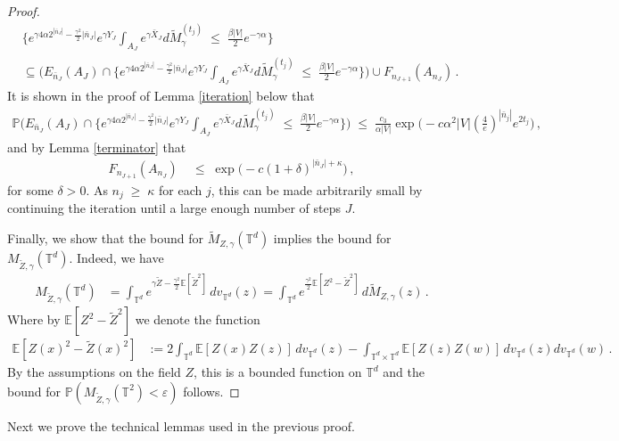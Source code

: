 \documentclass[11pt]{article}
\numberwithin{equation}{section}
\theoremstyle{definition}
\renewcommand{\tilde}{\widetilde}          %
\renewcommand{\leq}{\;\leqslant\;}                   %
\renewcommand{\geq}{\;\geqslant\;}                   %
\newcommand{\E}{\mathbb{E}}
\renewcommand{\P}{\mathbb{P}}
\def\eps{\varepsilon}
\def\T{\mathbb{T}}
\newcommand{\ab}{|}
\newcommand{\grea}{>}
\newcommand{\Pb}{\P}
\begin{document}
\begin{proof}
\begin{align*}
&\{ e^{\gamma 4 \alpha 2^{|\bar n_J|} - \frac{\gamma^2}{2} |\bar n_J|}  e^{\gamma Y_J} \int_{A_J} e^{\gamma \bar X_J} d \tilde M_\gamma^{(t_j)} \leq \tfrac{ \beta |V|}{2}  e^{-\gamma \alpha} \} \\&\subseteq \big(E_{\bar n_{J}}(A_J)\cap  \{ e^{\gamma 4 \alpha 2^{|\bar n_J|} - \frac{\gamma^2}{2} |\bar n_J|}  e^{\gamma Y_J} \int_{A_J} e^{\gamma \bar X_J} d \tilde M_\gamma^{(t_j)} \leq \tfrac{ \beta |V|}{2}  e^{-\gamma \alpha} \}\big) \cup F_{n_{J+1}}(A_{n_{J}})\,.
\end{align*}
It is shown in the proof of Lemma \ref{iteration} below that 
\begin{align*}
 \Pb \big(E_{\bar n_{J}}(A_J)\cap  \{ e^{\gamma 4 \alpha 2^{|\bar n_J|} - \frac{\gamma^2}{2} |\bar n_J|}  e^{\gamma Y_J} \int_{A_J} e^{\gamma \bar X_J} d \tilde M_\gamma^{(t_j)} \leq \tfrac{ \beta |V|}{2}  e^{-\gamma \alpha} \}\big) \leq  \frac{c_3}{\alpha |V|} \exp \big( - c \alpha^2 |V| (\tfrac{4}{e})^{|\bar n_j|} e^{2 t_{j}} \big)\,,
\end{align*}
and by Lemma \ref{terminator} that
\begin{align*}
  F_{n_{J+1}}(A_{n_{J}}) & \leq  \exp \big( -c (1+\delta)^{\ab \bar n_J \ab + \kappa} \big) \,, 
\end{align*}
for some $\delta \grea 0$. As $n_j \geq \kappa$ for each $j$, this can be made arbitrarily small by continuing the iteration until a large enough number of steps $J$.

Finally, we show that the bound for $\tilde M_{Z,\gamma}(\T^d)$ implies the bound for $M_{\tilde Z,\gamma}(\T^d)$. Indeed, we have 
\begin{align*}
M_{\tilde Z,\gamma}(\T^d) &= \int_{\T^d} e^{\gamma \tilde Z - \frac{\gamma^2}{2} \E [\tilde Z^2]} \, dv_{\T^d}(z) = \int_{\T^d} e^{\frac{\gamma^2}{2} \E[Z^2 - \tilde Z^2]} \, d \tilde M_{Z,\gamma}(z)\,.
\end{align*}
Where by $\E[Z^2- \tilde Z^2]$ we denote the function
\begin{align*}
\E[Z(x)^2 - \tilde Z(x)^2] &:= 2 \int_{\T^d} \E[Z(x) Z(z)] \, dv_{\T^d}(z) - \int_{\T^d \times \T^d} \E[Z(z)Z(w)] \, dv_{\T^d}(z) dv_{\T^d}(w)\,.
\end{align*}
By the assumptions on the field $Z$, this is a bounded function on $\T^d$ and the bound for $\P(M_{\tilde Z,\gamma}(\T^2) < \eps)$ follows.
\end{proof}

\noindent
Next we prove the technical lemmas used in the previous proof.
\end{document}
